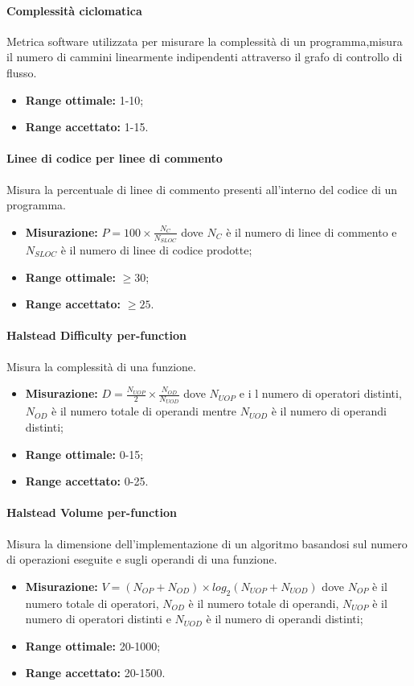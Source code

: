 			\paragraph{Complessità ciclomatica} \Spazio
			Metrica software utilizzata per misurare la complessità di un programma,misura il numero di cammini linearmente indipendenti attraverso il grafo di controllo di flusso.
			\begin{itemize}
				\item \textbf{Range ottimale:} 1-10;
				\item \textbf{Range accettato:} 1-15.
			\end{itemize}
			\paragraph{Linee di codice per linee di commento} \Spazio
			Misura la percentuale di linee di commento presenti all'interno del codice di un programma.
			\begin{itemize}
				\item \textbf{Misurazione:} $P=100\times\frac{N_C}{N_{SLOC}}$ dove $N_C$ è il numero di linee di commento e $N_{SLOC}$ è il numero di linee di codice prodotte;
				\item \textbf{Range ottimale:} $\geq30$;
				\item \textbf{Range accettato:} $\geq25$.
			\end{itemize}
			\paragraph{Halstead Difficulty per-function} \Spazio
			Misura la complessità di una funzione.
			\begin{itemize}
				\item \textbf{Misurazione:} $D=\frac{N_{UOP}}{2}\times\frac{N_{OD}}{N_{UOD}}$ dove $N_{UOP}$ e i l numero di operatori distinti, $N_{OD}$ è il numero totale di operandi mentre $N_{UOD}$ è il numero di operandi distinti;
				\item \textbf{Range ottimale:} 0-15;
				\item \textbf{Range accettato:} 0-25.
			\end{itemize}
			\paragraph{Halstead Volume per-function} \Spazio
			Misura la dimensione dell'implementazione di un algoritmo basandosi sul numero di operazioni eseguite e sugli operandi di una funzione.
			\begin{itemize}
				\item \textbf{Misurazione:} $V=(N_{OP} + N_{OD})\times log_2(N_{UOP} + N_{UOD})$  dove $N_{OP}$ è il numero totale di operatori, $N_{OD}$ è il numero totale di operandi, $N_{UOP}$ è
				il numero di operatori distinti e $N_{UOD}$ è il numero di operandi distinti;
			\item \textbf{Range ottimale:} 20-1000;
			\item \textbf{Range accettato:} 20-1500.
			\end{itemize}
